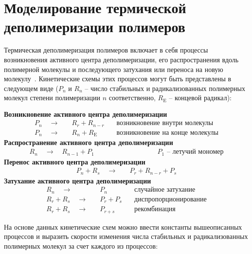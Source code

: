 \section{Моделирование термической деполимеризации полимеров} \label{sec:depolymerization}
Термическая деполимеризация полимеров включает в себя процессы возникновения активного центра деполимеризации, его распространения вдоль полимерной молекулы и последующего затухания или переноса на новую молекулу~\cite{Boyd_1}. Кинетические схемы этих процессов могут быть представлены в следующем виде ($P_n$ и $R_n$ -- число стабильных и радикализованных полимерных молекул степени полимеризации $n$ соответственно, $R_\mathrm{E}$ -- концевой радикал):

\begin{center}
	\textbf{Возникновение активного центра деполимеризации}
	\begin{align*}
		P_n \quad \rightarrow \quad & R_r + R_{n-r} \quad & \text{возникновение внутри молекулы} \\
		P_n \quad \rightarrow \quad & R_n + R_\mathrm{E} \quad & \text{возникновение на конце молекулы}
	\end{align*}
	\textbf{Распространение активного центра деполимеризации}
	\begin{align*}
		R_n \quad \rightarrow \quad  R_{n-1} + P_1 \qquad\qquad\qquad\qquad\quad\; \text{$P_1$ -- летучий мономер}
	\end{align*}
	\textbf{Перенос активного центра деполимеризации}
	\begin{align*}
		P_n + R_s \quad \rightarrow \quad & P_r + R_{n-r} + P_s
	\end{align*}
	\textbf{Затухание активного центра деполимеризации}
	\begin{align*}
		R_n \quad \rightarrow \quad & P_n \quad & \text{случайное затухание} \\
		R_r + R_s \quad \rightarrow \quad & P_r + P_s \quad & \text{диспропорционирование} \\
		R_r + R_s \quad \rightarrow \quad & P_{r + s} \quad & \text{рекомбинация}
	\end{align*}
\end{center}
На основе данных кинетические схем можно ввести константы вышеописанных процессов и выразить скорости изменения числа стабильных и радикализованных полимерных молекул за счет каждого из процессов:

